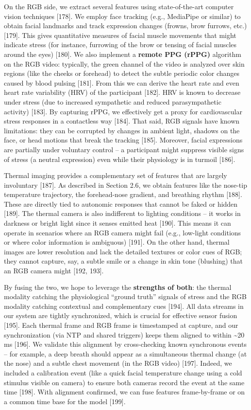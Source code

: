 \documentclass{article}
\begin{document}
    On the RGB side, we extract several features using state-of-the-art computer vision techniques [178]. We employ face tracking (e.g., MediaPipe or similar) to obtain facial landmarks and track expression changes (frowns, brow furrows, etc.) [179]. This gives quantitative measures of facial muscle movements that might indicate stress (for instance, furrowing of the brow or tensing of facial muscles around the eyes) [180]. We also implement a \textbf{remote PPG (rPPG)} algorithm on the RGB video: typically, the green channel of the video is analyzed over skin regions (like the cheeks or forehead) to detect the subtle periodic color changes caused by blood pulsing [181]. From this we can derive the heart rate and even heart rate variability (HRV) of the participant [182]. HRV is known to decrease under stress (due to increased sympathetic and reduced parasympathetic activity) [183]. By capturing rPPG, we effectively get a proxy for cardiovascular stress responses in a contactless way [184]. That said, RGB signals have known limitations: they can be corrupted by changes in ambient light, shadows on the face, or head motions that break the tracking [185]. Moreover, facial expressions are partially under voluntary control – a participant might suppress visible signs of stress (a neutral expression) even while their physiology is in turmoil [186].

    Thermal imaging provides a complementary set of features that are largely involuntary [187]. As described in Section 2.6, we obtain features like the nose-tip temperature trajectory, the forehead-nose gradient, and breathing rhythm [188]. These are directly tied to autonomic responses that cannot be faked or hidden [189]. The thermal camera is also indifferent to lighting conditions – it works in darkness or bright light since it senses emitted heat [190]. This means it can operate in scenarios where an RGB camera might fail (e.g., low-light conditions or where color information is ambiguous) [191]. On the other hand, thermal images are lower resolution and lack the detailed textures or color cues of RGB; they cannot capture, say, a subtle smile or a change in skin tone (blushing) that an RGB camera might [192, 193].

    By fusing the two, we hope to leverage the \textbf{strengths of both}: the thermal modality catching the physiological “ground truth” signals of stress and the RGB modality catching contextual and complementary cues [194]. All data streams in our system are tightly synchronized, which is crucial for effective sensor fusion [195]. Each thermal frame and RGB frame is timestamped at capture, and our synchronization (via NTP and shared triggers) keeps them aligned to within \textasciitilde20 ms [196]. We validate this alignment by cross-checking known synchronous events – for example, a deep breath should appear as a simultaneous thermal change (at the nose) and a subtle chest movement (in the RGB video) [197]. Indeed, we included a calibration event (like a quick facial temperature change using a cold stimulus visible on camera) to ensure both cameras record the event at the same time [198]. With alignment confirmed, we can fuse features frame-by-frame or on a common time base for the model [199].
\end{document}
